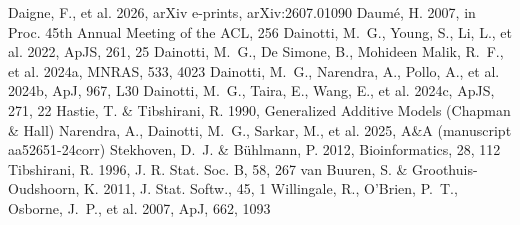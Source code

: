 \documentclass{aa}
\begin{document}
\begin{thebibliography}{}
 Daigne, F., et al. 2026, arXiv e-prints,
  arXiv:2607.01090
 Daum\'e, H. 2007, in Proc. 45th Annual Meeting of
  the ACL, 256
 Dainotti, M.~G., Young, S.,
  Li, L., et al. 2022, ApJS, 261, 25
 Dainotti, M.~G., De Simone, B.,
  Mohideen Malik, R.~F., et al. 2024a, MNRAS, 533, 4023
 Dainotti, M.~G., Narendra, A.,
  Pollo, A., et al. 2024b, ApJ, 967, L30
 Dainotti, M.~G., Taira, E.,
  Wang, E., et al. 2024c, ApJS, 271, 22
 Hastie, T. \& Tibshirani, R. 1990,
  Generalized Additive Models (Chapman \& Hall)
 Narendra, A., Dainotti, M.~G.,
  Sarkar, M., et al. 2025, A\&A (manuscript aa52651-24corr)
 Stekhoven, D.~J. \&
  B\"uhlmann, P. 2012, Bioinformatics, 28, 112
 Tibshirani, R. 1996, J. R. Stat. Soc. B,
  58, 267
 van Buuren, S. \&
  Groothuis-Oudshoorn, K. 2011, J. Stat. Softw., 45, 1
 Willingale, R., O'Brien, P.~T.,
  Osborne, J.~P., et al. 2007, ApJ, 662, 1093
\end{thebibliography}
\end{document}
